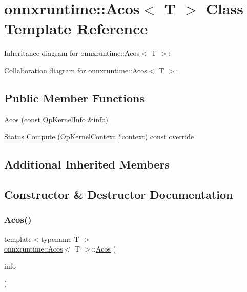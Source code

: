 \hypertarget{classonnxruntime_1_1Acos}{}\section{onnxruntime\+:\+:Acos$<$ T $>$ Class Template Reference}
\label{classonnxruntime_1_1Acos}


Inheritance diagram for onnxruntime\+:\+:Acos$<$ T $>$\+:


Collaboration diagram for onnxruntime\+:\+:Acos$<$ T $>$\+:
\subsection*{Public Member Functions}
\begin{DoxyCompactItemize}
\item 
\mbox{\hyperlink{classonnxruntime_1_1Acos_a2cc162445f4619a734d1c99232e0538a}{Acos}} (const \mbox{\hyperlink{classonnxruntime_1_1OpKernelInfo}{Op\+Kernel\+Info}} \&info)
\item 
\mbox{\hyperlink{classonnxruntime_1_1common_1_1Status}{Status}} \mbox{\hyperlink{classonnxruntime_1_1Acos_a571d0fb308a9e448a4621cd6b1f28926}{Compute}} (\mbox{\hyperlink{classonnxruntime_1_1OpKernelContext}{Op\+Kernel\+Context}} $\ast$context) const override
\end{DoxyCompactItemize}
\subsection*{Additional Inherited Members}


\subsection{Constructor \& Destructor Documentation}
\mbox{\label{classonnxruntime_1_1Acos_a2cc162445f4619a734d1c99232e0538a}} 
\subsubsection{\texorpdfstring{Acos()}{Acos()}}
{\footnotesize\ttfamily template$<$typename T $>$ \\
\mbox{\hyperlink{classonnxruntime_1_1Acos}{onnxruntime\+::\+Acos}}$<$ T $>$\+::\mbox{\hyperlink{classonnxruntime_1_1Acos}{Acos}} (\begin{DoxyParamCaption}\item[{const \mbox{\hyperlink{classonnxruntime_1_1OpKernelInfo}{Op\+Kernel\+Info}} \&}]{info }\end{DoxyParamCaption})\hspace{0.3cm}{\ttfamily [inline]}}



